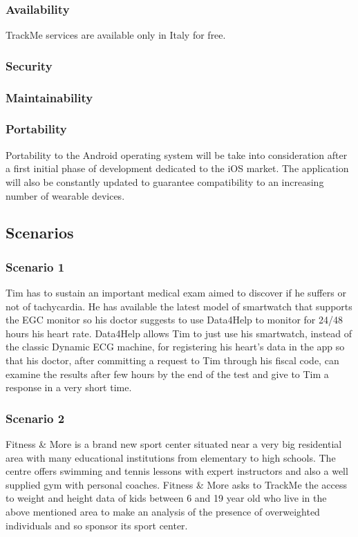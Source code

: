 \documentclass{article}
\begin{document}
	\subsubsection{Availability}
	TrackMe services are available only in Italy for free.
	
	\subsubsection{Security}
	
	\subsubsection{Maintainability}
	
	\subsubsection{Portability}
	Portability to the Android operating system will be take into 
	consideration after a first initial phase of development dedicated
	to the iOS market. \newline
	The application will also be constantly updated to guarantee 
	compatibility to an increasing number of wearable devices. 
	
\newpage
\subsection{Scenarios}

	\subsubsection{Scenario 1}
	Tim has to sustain an important medical exam aimed to discover if 
	he suffers or not of tachycardia. He has available the latest 
	model of smartwatch that supports the EGC monitor so his doctor 
	suggests to use Data4Help to monitor for 24/48 hours his heart 
	rate. Data4Help allows Tim to just use his smartwatch, instead of 
	the classic Dynamic ECG machine, for registering his heart’s data 
	in the app so that his doctor, after committing a request to Tim 
	through his fiscal code, can examine the results after few hours 
	by the end of the test and give to Tim a response in a very short 
	time. 

	\subsubsection{Scenario 2}
	Fitness \& More is a brand new sport center situated near a very
	big residential area with many educational institutions from 
	elementary to high schools. The centre offers swimming and tennis
	lessons with expert instructors and also a well supplied gym with
	personal coaches. \newline
	Fitness \& More asks to TrackMe the access to weight and height 
	data of kids between 6 and 19 year old who live in the above 
	mentioned area to make an analysis of the presence of overweighted
	individuals and so sponsor its sport center. 
\end{document}
